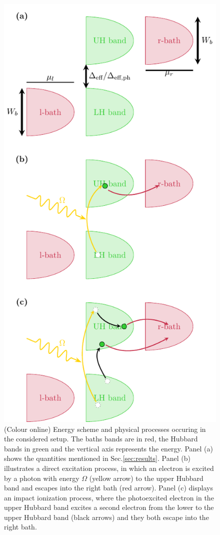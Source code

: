 \documentclass[aps,prb,groupedaddress,showpacs,twocolumn,superscriptaddress,10pt]{revtex4-2}
\begin{document}
\begin{figure}[ht]
\includegraphics[width=0.9\linewidth]{./figures_Paper1/energy_setup.pdf}
\caption{(Colour online) Energy scheme and physical processes occuring in the considered setup. The baths bands are in red, the Hubbard bands in green and the vertical axis represents the energy. Panel (a) shows the quantities mentioned in Sec.\ref{sec:results}. Panel (b) illustrates a direct excitation process, in which an electron is excited  by a photon with energy $\Omega$ (yellow arrow) to the upper Hubbard band and escapes into the right bath (red arrow). Panel (c) displays an impact ionization process, where the photoexcited electron in the upper Hubbard band excites a second electron from the lower to the upper Hubbard band (black arrows) and they both escape into the right bath.}
\label{fig:energy_setup}
\end{figure}   
\end{document}
